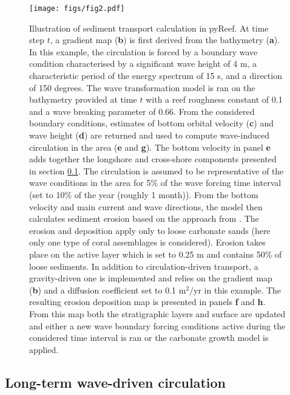 \documentclass[default,jgrga]{agutex2015}
\begin{document}
\begin{article}
\begin{figure}
\centering
\noindent\texttt{[image: figs/fig2.pdf]}
\caption{Illustration of sediment transport calculation in pyReef. At time step $t$, a gradient map (\textbf{b}) is first derived from the bathymetry (\textbf{a}). In this example, the circulation is forced by a boundary wave condition characterised by a significant wave height of 4 m, a characteristic period of the energy spectrum of 15 s, and a direction of 150 degrees. The wave transformation model is ran on the bathymetry provided at time $t$ with a reef roughness constant of 0.1 and a wave breaking parameter of 0.66. From the considered boundary conditions, estimates of bottom orbital velocity (\textbf{c}) and wave height (\textbf{d}) are returned and used to compute wave-induced circulation in the area (\textbf{e} and \textbf{g}). The bottom velocity in panel \textbf{e} adds together the longshore and cross-shore components presented in section \ref{seccirc}. The circulation is assumed to be representative of the wave conditions in the area for 5\% of the wave forcing time interval (set to 10\% of the year (roughly 1 month)). From the bottom velocity and main current and wave directions, the model then calculates sediment erosion based on the approach from \citet{Soulsby97}. The erosion and deposition apply only to loose carbonate sands (here only one type of coral assemblages is considered). Erosion takes place on the active layer which is set to 0.25 m and contains 50\% of loose sediments. In addition to circulation-driven transport, a gravity-driven one is implemented and relies on the gradient map (\textbf{b}) and a diffusion coefficient set to 0.1 $\textrm{m}^2\textrm{/yr}$ in this example. The resulting erosion deposition map is presented in panels \textbf{f} and \textbf{h}. From this map both the stratigraphic layers and surface are updated and either a new wave boundary forcing conditions active during the considered time interval is ran or the carbonate growth model is applied.}
\label{circfig}
\end{figure}

\subsection{Long-term wave-driven circulation}\label{seccirc}


\end{article}
\end{document}
